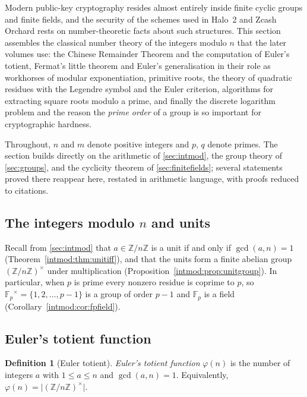 \documentclass[11pt,a4paper]{article}
\theoremstyle{definition}
\newtheorem{definition}[theorem]{Definition}
\theoremstyle{remark}
\newcommand{\Z}{\ensuremath{\mathbb{Z}}}
\newcommand{\Fp}{\ensuremath{\mathbb{F}_{p}}}
\begin{document}
Modern public-key cryptography resides almost entirely inside finite cyclic groups and finite fields, and the security of the schemes used in Halo~2 and Zcash Orchard rests on number-theoretic facts about such structures. This section assembles the classical number theory of the integers modulo \(n\) that the later volumes use: the Chinese Remainder Theorem and the computation of Euler's totient, Fermat's little theorem and Euler's generalisation in their role as workhorses of modular exponentiation, primitive roots, the theory of quadratic residues with the Legendre symbol and the Euler criterion, algorithms for extracting square roots modulo a prime, and finally the discrete logarithm problem and the reason the \emph{prime order} of a group is so important for cryptographic hardness.

Throughout, \(n\) and \(m\) denote positive integers and \(p\), \(q\) denote primes. The section builds directly on the arithmetic of \cref{sec:intmod}, the group theory of \cref{sec:groups}, and the cyclicity theorem of \cref{sec:finitefields}; several statements proved there reappear here, restated in arithmetic language, with proofs reduced to citations.

\subsection{The integers modulo \texorpdfstring{\(n\)}{n} and units}\label{numbertheory:subsec:units}

Recall from \cref{sec:intmod} that \(a \in \Z/n\Z\) is a unit if and only if \(\gcd(a,n) = 1\) (Theorem~\ref{intmod:thm:unitiff}), and that the units form a finite abelian group \((\Z/n\Z)^\times\) under multiplication (Proposition~\ref{intmod:prop:unitgroup}). In particular, when \(p\) is prime every nonzero residue is coprime to \(p\), so \(\Fp^\times = \{1,2,\dots,p-1\}\) is a group of order \(p-1\) and \(\Fp\) is a field (Corollary~\ref{intmod:cor:fpfield}).

\subsection{Euler's totient function}\label{numbertheory:subsec:totient}

\begin{definition}[Euler totient]\label{numbertheory:def:totient}
\emph{Euler's totient function} \(\varphi(n)\) is the number of integers \(a\) with \(1 \le a \le n\) and \(\gcd(a,n)=1\). Equivalently, \(\varphi(n) = \lvert (\Z/n\Z)^\times \rvert\).
\end{definition}
\end{document}
